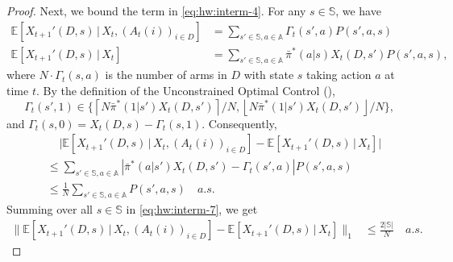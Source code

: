 \documentclass[11pt,letterpaper]{article}
\theoremstyle{plain}
\theoremstyle{definition}
\theoremstyle{remark}
\newcommand{\normbig}[1]{\big\lVert#1\big\rVert}
\newcommand{\E}[1]{\mathbb{E}\left[#1\right]}
\newcommand{\givenplain}{\,|\,}
\newcommand{\abs}[1]{\left\lvert#1\right\rvert}
\newcommand{\absbig}[1]{\big\lvert#1\big\rvert}
\newcommand{\ceil}[1]{\left\lceil#1\right\rceil}
\newcommand{\floor}[1]{\left\lfloor#1\right\rfloor}
\newcommand{\sspa}{\mathbb{S}}
\newcommand{\aspa}{\mathbb{A}}
\newcommand{\pibar}{{\sysbar{\pi}}}
\newcommand{\pibs}{{\pibar^*}}
\newcommand{\sysbar}[1]{\bar{#1}}
\begin{document}
\begin{proof}
    Next, we bound the term in \eqref{eq:hw:interm-4}. 
    For any $s\in\sspa$, we have
    \begin{align*}
        \E{X_{t+1}'(D, s) \givenplain X_t, (A_t(i))_{i\in D}} &= \sum_{s'\in\sspa, a\in\aspa} \Gamma_t(s',a) P(s', a, s)  \\
        \E{X_{t+1}'(D, s) \givenplain X_t} 
        &= \sum_{s'\in\sspa, a\in\aspa} \pibs(a|s) X_t(D, s') P(s', a, s), 
    \end{align*}
    where $N\cdot\Gamma_t(s,a)$ is the number of arms in $D$ with state $s$ taking action $a$ at time $t$. By the definition of the Unconstrained Optimal Control (), 
    \[
      \Gamma_t(s',1) \in \{\ceil{N\pibs(1|s') X_t(D, s')}/N, \floor{N\pibs(1|s') X_t(D, s')}/N \},
    \]
    and $\Gamma_t(s,0) = X_t(D, s) - \Gamma_t(s,1)$. 
    Consequently, 
    \begin{align}
        \nonumber
        &\mspace{20mu} \absbig{\E{X_{t+1}'(D, s) \givenplain X_t, (A_t(i))_{i\in D}} - \E{X_{t+1}'(D, s) \givenplain X_t} }  \\
        \nonumber
        &\leq \sum_{s'\in\sspa, a\in\aspa} \abs{\pibs(a|s') X_t(D, s')  -  \Gamma_t(s',a)} P(s', a, s) \\
        \label{eq:hw:interm-7}
        &\leq \frac{1}{N} \sum_{s'\in\sspa, a\in\aspa} P(s', a, s) \quad a.s. 
    \end{align}
    Summing over all $s\in\sspa$ in \eqref{eq:hw:interm-7}, we get 
    \begin{align}
        \label{eq:hw:interm-8}
        \normbig{\E{X_{t+1}'(D, s) \givenplain X_t, (A_t(i))_{i\in D}} - \E{X_{t+1}'(D, s) \givenplain X_t}}_1 
        &\leq \frac{2|\sspa|}{N} \quad a.s.
    \end{align}


\end{proof}
\end{document}
